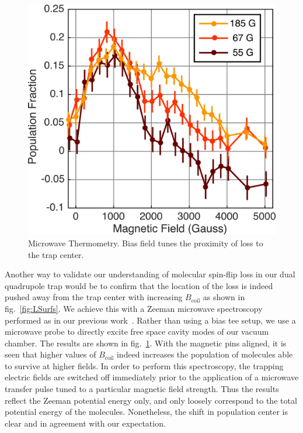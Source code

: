 \documentclass[%
 reprint,
groupedaddress,
 amsmath,amssymb,
 aps,
prl,
]{revtex4-1}
\begin{document}
\begin{figure}[tb]
\includegraphics[width=\linewidth]{MWSpec/MW-therm-dave-heat.png}%
\caption{
Microwave Thermometry. Bias field tunes the proximity of loss to the trap center. 
\label{fig:spec}}
\end{figure}

Another way to validate our understanding of molecular spin-flip loss in our dual quadrupole trap would be to confirm that the location of the loss is indeed pushed away from the trap center with increasing $B_\text{coil}$ as shown in fig.~\ref{fig:LSurfs}. We achieve this with a Zeeman microwave spectroscopy performed as in our previous work~\cite{Stuhl2012evap}. Rather than using a bias tee setup, we use a microwave probe to directly excite free space cavity modes of our vacuum chamber. The results are shown in fig.~\ref{fig:spec}. With the magnetic pins aligned, it is seen that higher values of $B_{\text{coil}}$ indeed increases the population of molecules able to survive at higher fields. In order to perform this spectroscopy, the trapping electric fields are switched off immediately prior to the application of a microwave transfer pulse tuned to a particular magnetic field strength. Thus the results reflect the Zeeman potential energy only, and only loosely correspond to the total potential energy of the molecules. Nonetheless, the shift in population center is clear and in agreement with our expectation.  %
\end{document}
